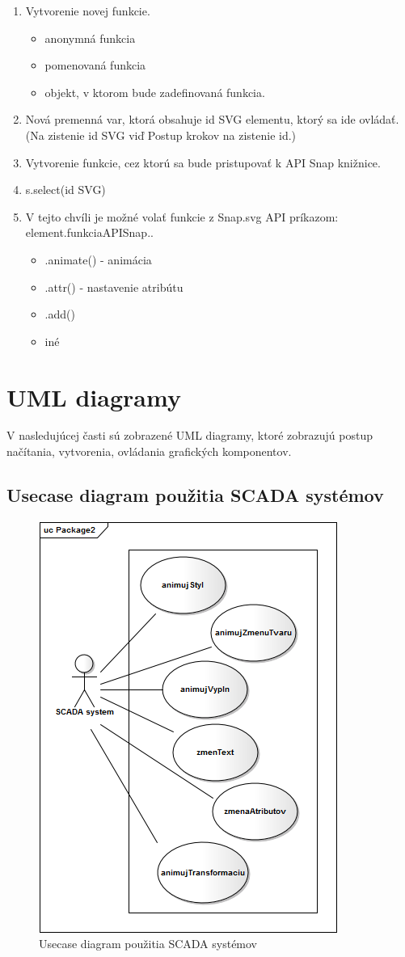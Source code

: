 \begin{enumerate}
	\item Vytvorenie novej funkcie. 
	\begin{itemize}
		\item anonymná funkcia 
		\item pomenovaná funkcia
		\item objekt, v ktorom bude zadefinovaná funkcia. 
	\end{itemize}
	\item Nová premenná var, ktorá obsahuje id SVG elementu, ktorý sa ide ovládať. (Na zistenie id SVG viď Postup krokov na zistenie id.)
	\item Vytvorenie funkcie, cez ktorú sa bude pristupovať k API Snap knižnice. 
	\item s.select(id SVG)
	\item V tejto chvíli je možné volať funkcie z Snap.svg API príkazom: element.funkciaAPISnap.. 
	\begin{itemize}
		\item .animate() - animácia
		\item .attr() - nastavenie atribútu
		\item .add()
		\item iné
		
	\end{itemize}
  	
	
\end{enumerate}




\section{UML diagramy}

V nasledujúcej časti sú zobrazené UML diagramy, ktoré zobrazujú postup načítania, vytvorenia, ovládania grafických komponentov.

	\subsection{Usecase diagram použitia SCADA systémov}
	\begin{figure}[H]
		\centering
		\includegraphics[width=0.50\linewidth]{uml/usecase.png}
		\caption{Usecase diagram použitia SCADA systémov}
		\label{fig:USECASE}
	\end{figure}

